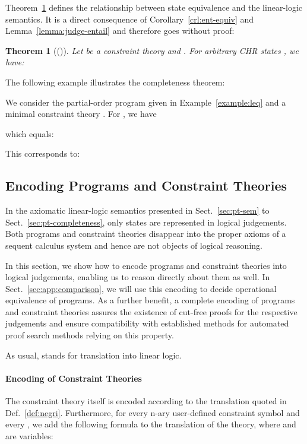 \documentclass[acmtocl]{acmtrans2m}
\newtheorem{theorem}{Theorem}[section]
\begin{document}
Theorem~\ref{thm:equiv-ll} defines the relationship between state equivalence
and the linear-logic semantics. It is a direct consequence of
Corollary~\ref{crl:ent-equiv} and
Lemma~\ref{lemma:judge-entail} and therefore goes without proof:

\begin{theorem}[()]
\label{thm:equiv-ll}
Let  be a constraint theory and .
For arbitrary CHR states , we have:

\end{theorem}

The following example illustrates the completeness theorem:

\begin{example}
We consider the partial-order program  given in Example~\ref{example:leq} and a minimal
constraint
theory . For , we have

which equals:

This corresponds to:

\end{example}

\subsection{Encoding Programs and Constraint Theories}
\label{sec:enc-sem}

In the axiomatic linear-logic semantics presented in Sect.~\ref{sec:pt-sem} to
Sect.~\ref{sec:pt-completeness}, only states are represented in logical
judgements. Both programs and constraint theories disappear into the proper
axioms of a sequent calculus system and hence are not objects of logical
reasoning.

In this section, we show how to encode programs and constraint theories into
logical judgements, enabling us to reason directly about them as well. In
Sect.~\ref{sec:app:comparison}, we will use this encoding to decide operational
equivalence of programs. As a further benefit, a complete encoding of programs
and constraint theories assures the existence of cut-free proofs for the
respective judgements and ensure compatibility with established methods for
automated proof search methods relying on this property.

As usual, 
stands for translation into linear logic.

\paragraph*{Encoding of Constraint Theories}
The constraint theory  itself is encoded according to the translation quoted
in Def.~\ref{def:negri}. Furthermore, for every n-ary
user-defined constraint symbol  and every , we add the
following formula to the translation of the theory, where  and
 are variables:
\end{document}

